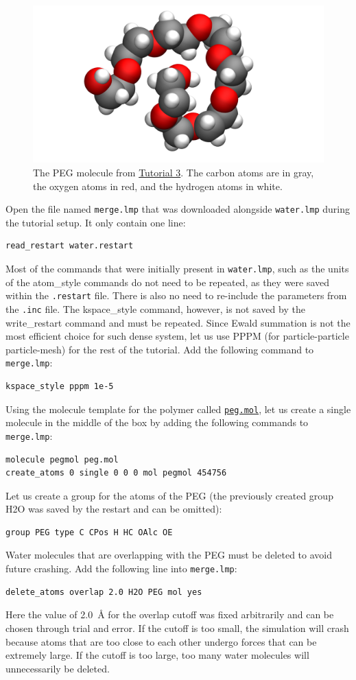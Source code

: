 \documentclass[9pt,tutorial]{livecoms}
\newcommand{\lmpcmd}[1]{\hspace{0pt}\colorbox{listing}{\textcolor{command}{\small{#1}}}\hspace{0pt}} %
\newcommand{\flecmd}[1]{\textcolor{command}{\texttt{#1}}} %
\newcommand{\dwlcmd}[1]{\textcolor{download}{\texttt{#1}}} %
\newcommand{\filepath}{https://raw.githubusercontent.com/lammpstutorials/lammpstutorials-article/main/files/}
\begin{document}
\begin{figure}
\centering
\includegraphics[width=0.8\linewidth]{PEG-in-vacuum}
\caption{The PEG molecule from \hyperref[all-atom-label]{Tutorial 3}.
The carbon atoms are in gray, the oxygen atoms in red, and the hydrogen atoms in white.}
\label{fig:PEG-in-vacuum}
\end{figure}

Open the file named \flecmd{merge.lmp} that was downloaded
alongside \flecmd{water.lmp} during the tutorial setup.  It only contain one line:
\begin{lstlisting}
read_restart water.restart
\end{lstlisting}
Most of the commands that were initially present in \flecmd{water.lmp}, such as
the \lmpcmd{units} of the \lmpcmd{atom\_style} commands do not need to be repeated,
as they were saved within the \flecmd{.restart} file.  There is also no need to
re-include the parameters from the \flecmd{.inc} file.  The \lmpcmd{kspace\_style}
command, however, is not saved by the \lmpcmd{write\_restart} command and must be
repeated.  Since Ewald summation is not the most efficient choice for such dense
system, let us use PPPM (for particle-particle particle-mesh) for the rest
of the tutorial.  Add the following command to \flecmd{merge.lmp}:
\begin{lstlisting}
kspace_style pppm 1e-5
\end{lstlisting}
Using the molecule template for the polymer called
\href{\filepath tutorial3/peg.mol}{\dwlcmd{peg.mol}},
let us create a single molecule in the middle of the box by adding the following
commands to \flecmd{merge.lmp}:
\begin{lstlisting}
molecule pegmol peg.mol
create_atoms 0 single 0 0 0 mol pegmol 454756
\end{lstlisting}
Let us create a group for the atoms of the PEG (the previously created
group H2O was saved by the restart and can be omitted):
\begin{lstlisting}
group PEG type C CPos H HC OAlc OE
\end{lstlisting}
Water molecules that are overlapping with the PEG must be deleted to avoid future
crashing.  Add the following line into \flecmd{merge.lmp}:
\begin{lstlisting}
delete_atoms overlap 2.0 H2O PEG mol yes
\end{lstlisting}
Here the value of 2.0~Å for the overlap cutoff was fixed arbitrarily and can
be chosen through trial and error.  If the cutoff is too small, the simulation will
crash because atoms that are too close to each other undergo forces
that can be extremely large.  If the cutoff is too large, too many water
molecules will unnecessarily be deleted.
\end{document}
